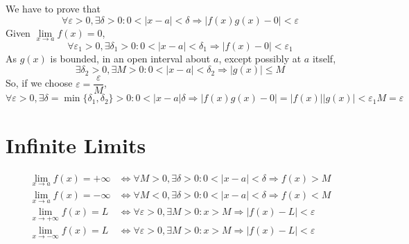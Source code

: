 \documentclass[fleqn]{article}
\begin{document}
We have to prove that
\begin{equation*}
\forall \varepsilon > 0, \exists \delta > 0 : 0 < \left|x - a\right| < \delta \Rightarrow \left|f(x) g(x) - 0\right| < \varepsilon
\end{equation*}
Given $\lim\limits_{x \rightarrow a} f(x) = 0$,
\begin{equation*}
	\forall \varepsilon_1 > 0, \exists \delta_1 > 0 : 0 < \left|x - a\right| < \delta_1 \Rightarrow \left|f(x) - 0\right| < \varepsilon_1
\end{equation*}
As $g(x)$ is bounded, in an open interval about $a$, except possibly at $a$ itself,
\begin{equation*}
	\exists \delta_2 > 0, \exists M > 0 : 0 < \left|x - a\right| < \delta_2 \Rightarrow \left|g(x)\right| \leq M
\end{equation*}
So, if we choose $\varepsilon = \dfrac{\varepsilon}{M}$, 
\begin{equation*}
	\forall \varepsilon > 0, \exists \delta = \min\{\delta_1, \delta_2\} > 0 : 0 < \left|x - a\right| \delta \Rightarrow \left|f(x) g(x) - 0\right| = |f(x)| |g(x)| < \varepsilon_1 M = \varepsilon
\end{equation*}


\section{Infinite Limits}

\begin{align*}
	\lim\limits_{x \rightarrow a} f(x) = +\infty &\Leftrightarrow \forall M > 0, \exists \delta > 0 : 0 < |x - a| < \delta \Rightarrow f(x) > M\\
	\lim\limits_{x \rightarrow a} f(x) = -\infty &\Leftrightarrow \forall M < 0, \exists \delta > 0 : 0 < |x - a| < \delta \Rightarrow f(x) < M\\
	\lim\limits_{x \rightarrow +\infty} f(x) = L &\Leftrightarrow\forall \varepsilon > 0, \exists M > 0 : x > M \Rightarrow |f(x) - L| < \varepsilon\\
	\lim\limits_{x \rightarrow -\infty} f(x) = L &\Leftrightarrow\forall \varepsilon > 0, \exists M > 0 : x > M \Rightarrow |f(x) - L| < \varepsilon
\end{align*}
\end{document}

